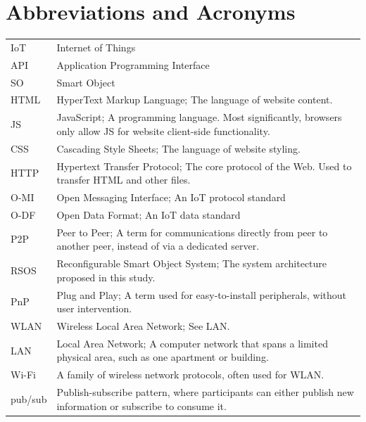 \chapter*{Abbreviations and Acronyms}


\noindent
\begin{longtable}{@{}p{}p{}@{}}
IoT & Internet of Things \\
API  & Application Programming Interface \\
SO   & Smart Object \\
HTML & HyperText Markup Language; The language of website content. \\
JS   & JavaScript; A programming language. Most significantly, browsers only allow JS for website client-side functionality. \\
CSS  & Cascading Style Sheets; The language of website styling. \\
HTTP & Hypertext Transfer Protocol; The core protocol of the Web. Used to transfer HTML and other files. \\
O-MI & Open Messaging Interface; An IoT protocol standard \\
O-DF & Open Data Format; An IoT data standard \\
P2P & Peer to Peer; A term for communications directly from peer to another peer, instead of via a dedicated server. \\
RSOS & Reconfigurable Smart Object System; The system architecture proposed in this study. \\
PnP & Plug and Play; A term used for easy-to-install peripherals, without user intervention. \\
WLAN & Wireless Local Area Network; See LAN. \\
LAN & Local Area Network; A computer network that spans a limited physical area, such as one apartment or building. \\
Wi-Fi & A family of wireless network protocols, often used for WLAN. \\
pub/sub & Publish-subscribe pattern, where participants can either publish new information or subscribe to consume it. \\

\end{longtable}
